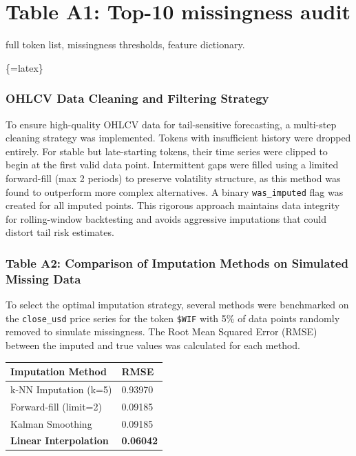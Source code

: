 \documentclass[
  a4paper,
  DIV=11,
  numbers=noendperiod]{scrreprt}
\begin{document}
\cleardoublepage
{}
{}
\appendix

\chapter{Table A1: Top-10 missingness audit}\label{apx-missing-top10}

full token list, missingness thresholds, feature dictionary.

\{=latex\} 

\subsection{OHLCV Data Cleaning and Filtering
Strategy}\label{sec-cleaning-strategy}

To ensure high-quality OHLCV data for tail-sensitive forecasting, a
multi-step cleaning strategy was implemented. Tokens with insufficient
history were dropped entirely. For stable but late-starting tokens,
their time series were clipped to begin at the first valid data point.
Intermittent gaps were filled using a limited forward-fill (max 2
periods) to preserve volatility structure, as this method was found to
outperform more complex alternatives. A binary \texttt{was\_imputed}
flag was created for all imputed points. This rigorous approach
maintains data integrity for rolling-window backtesting and avoids
aggressive imputations that could distort tail risk estimates.

\subsection{Table A2: Comparison of Imputation Methods on Simulated
Missing Data}\label{imp-table}

To select the optimal imputation strategy, several methods were
benchmarked on the \texttt{close\_usd} price series for the token
\texttt{\$WIF} with 5\% of data points randomly removed to simulate
missingness. The Root Mean Squared Error (RMSE) between the imputed and
true values was calculated for each method.

\begin{longtable}[]{@{}ll@{}}
\toprule\noalign{}
Imputation Method & RMSE \\
\midrule\noalign{}
\endhead
\bottomrule\noalign{}
\endlastfoot
k-NN Imputation (k=5) & 0.93970 \\
Forward-fill (limit=2) & 0.09185 \\
Kalman Smoothing & 0.09185 \\
\textbf{Linear Interpolation} & \textbf{0.06042} \\
\end{longtable}
\end{document}
